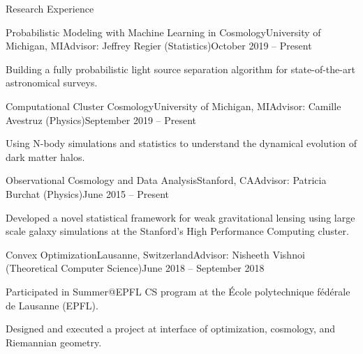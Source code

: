 \documentclass{resume} %
\begin{document}
\begin{rSection}{Research Experience}

\begin{rSubsection}{Probabilistic Modeling with Machine Learning in Cosmology}{University of Michigan, MI}{Advisor: Jeffrey Regier (Statistics)}{October 2019 -- Present}
\item Building a fully probabilistic light source separation algorithm for state-of-the-art astronomical surveys.
\end{rSubsection}

\begin{rSubsection}{Computational Cluster Cosmology}{University of Michigan, MI}{Advisor: Camille Avestruz (Physics)}{September 2019 -- Present}
\item Using N-body simulations and statistics to understand the dynamical evolution of dark matter halos. 
\end{rSubsection}

\begin{rSubsection}{Observational Cosmology and Data Analysis}{Stanford, CA}{Advisor: Patricia Burchat (Physics)}{June 2015 -- Present}
\item Developed a novel statistical framework for weak gravitational lensing using large scale galaxy simulations at the Stanford's High Performance Computing cluster.
\end{rSubsection}

\begin{rSubsection}{Convex Optimization}{Lausanne, Switzerland}{Advisor: Nisheeth Vishnoi (Theoretical Computer Science)}{June 2018 -- September 2018}
\item Participated in Summer@EPFL CS program at the \'Ecole polytechnique f\'ed\'erale de Lausanne (EPFL).
\item Designed and executed a project at interface of optimization, cosmology, and Riemannian geometry.
\end{rSubsection}
\end{rSection}
\end{document}
